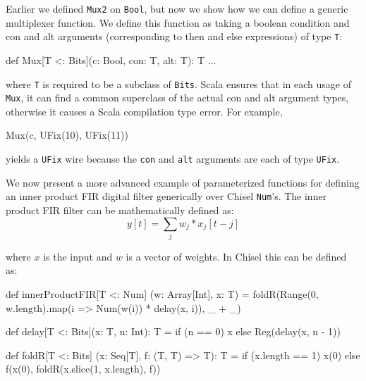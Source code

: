\documentclass[twocolumn,10pt]{article}
\def\code#1{{\tt #1}}
\begin{document}
Earlier we defined \code{Mux2} on \code{Bool}, but now we show how we can define a generic multiplexer function.
We define this function as taking a boolean condition and con and alt arguments (corresponding to then and else expressions) of type \code{T}:

\begin{scala}
def Mux[T <: Bits](c: Bool, con: T, alt: T): T { ... }
\end{scala}

\noindent
where \code{T} is required to be a subclass of \code{Bits}.
Scala ensures that in each usage of \code{Mux}, it can find a common superclass of the actual con and alt argument types, 
otherwise it causes a Scala compilation type error.
For example,

\begin{scala}
Mux(c, UFix(10), UFix(11))
\end{scala}

\noindent
yields a \code{UFix} wire because the \code{con} and \code{alt} arguments are each of type \code{UFix}.

% 
% 

We now present a more advanced example of parameterized functions for defining an inner product FIR digital filter generically over Chisel \code{Num}'s.
The inner product FIR filter can be mathematically defined as:
\begin{equation}
y[t] = \sum_j w_j * x_j[t-j]
\end{equation}

\noindent 
where $x$ is the input and $w$ is a vector of weights.
In Chisel this can be defined as:

\begin{scala}
def innerProductFIR[T <: Num] (w: Array[Int], x: T) = 
  foldR(Range(0, w.length).map(i => Num(w(i)) * delay(x, i)), _ + _)

def delay[T <: Bits](x: T, n: Int): T =
  if (n == 0) x else Reg(delay(x, n - 1))

def foldR[T <: Bits] (x: Seq[T], f: (T, T) => T): T =
  if (x.length == 1) x(0) else f(x(0), foldR(x.slice(1, x.length), f))
\end{scala}
 
\end{document}
